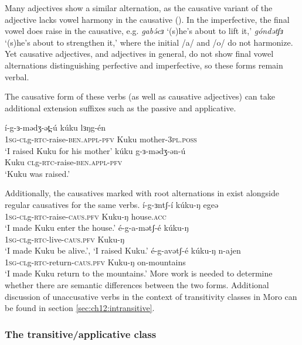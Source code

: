 Many adjectives show a similar alternation, as the causative variant of the adjective lacks vowel harmony in the causative (). In the imperfective, the final vowel does raise in the causative, e.g. \textit{gabə́cɜ} `(s)he's about to lift it,' \textit{góndətʃɜ} `(s)he's about to strengthen it,' where the initial /a/ and /o/ do not harmonize. Yet causative adjectives, and adjectives in general, do not show final vowel alternations distinguishing perfective and imperfective, so these forms remain verbal.

The causative form of these verbs (as well as causative adjectives) can take additional extension suffixes such as the passive and applicative. 

\ea  
\ea \gll í-g-ɜ-mədʒ-ət̪-ú kúku lɜŋg-én\\
\textsc{1sg-cl}g-\textsc{rtc}-raise-\textsc{ben.appl-pfv} Kuku mother-\textsc{3pl.poss}\\
\glt `I raised Kuku for his mother' 
\ex \gll kúku g-ɜ-mədʒ-ən-ú\\
Kuku \textsc{cl}g-\textsc{rtc}-raise-\textsc{ben.appl-pfv}\\
\glt  `Kuku was raised.'
\z 
\z

Additionally, the causatives marked with root alternations in  exist alongside regular causatives for the same verbs.
\ea 
	\ea \gll í-g-ɜntʃ-í kúku-ŋ egeə  \\
		 \textsc{1sg-cl}g-\textsc{rtc}-raise-\textsc{caus.pfv} Kuku-ŋ house.\textsc{acc}\\
		\glt 	 `I made Kuku enter the house.'
	\ex \gll é-g-a-mətʃ-é kúku-ŋ \\
		 \textsc{1sg-cl}g-\textsc{rtc}-live-\textsc{caus.pfv} Kuku-ŋ\\
		\glt 	 `I made Kuku be alive.', `I raised Kuku.'
	\ex \gll é-g-avətʃ-é kúku-ŋ n-ajen \\
		 \textsc{1sg-cl}g-\textsc{rtc}-return-\textsc{caus.pfv} Kuku-ŋ on-mountains\\
		\glt 	 `I made Kuku return to the mountains.'
	\z
\z
More work is needed to determine whether there are semantic differences between the two forms. Additional discussion of unaccusative verbs in the context of transitivity classes in Moro can be found in section \ref{sec:ch12:intransitive}.



\subsubsection{The transitive/applicative class}\label{sec:ch11:taalt}

